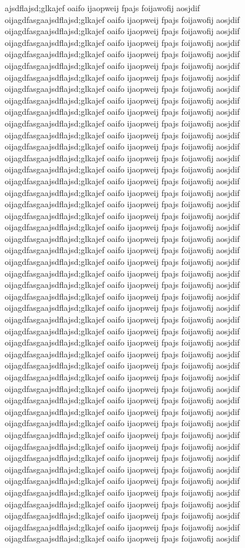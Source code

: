 \documentclass[twoside,a4paper,twocolumn,landscape]{PhanRaw}
\begin{document}
ajsdflajsd;glkajef oaifo ijaopweij fpajs foijawofij aosjdif oijagdfasgaajsdflajsd;glkajef oaifo ijaopweij fpajs foijawofij aosjdif oijagdfasgaajsdflajsd;glkajef oaifo ijaopweij fpajs foijawofij aosjdif oijagdfasgaajsdflajsd;glkajef oaifo ijaopweij fpajs foijawofij aosjdif oijagdfasgaajsdflajsd;glkajef oaifo ijaopweij fpajs foijawofij aosjdif oijagdfasgaajsdflajsd;glkajef oaifo ijaopweij fpajs foijawofij aosjdif oijagdfasgaajsdflajsd;glkajef oaifo ijaopweij fpajs foijawofij aosjdif oijagdfasgaajsdflajsd;glkajef oaifo ijaopweij fpajs foijawofij aosjdif oijagdfasgaajsdflajsd;glkajef oaifo ijaopweij fpajs foijawofij aosjdif oijagdfasgaajsdflajsd;glkajef oaifo ijaopweij fpajs foijawofij aosjdif oijagdfasgaajsdflajsd;glkajef oaifo ijaopweij fpajs foijawofij aosjdif oijagdfasgaajsdflajsd;glkajef oaifo ijaopweij fpajs foijawofij aosjdif oijagdfasgaajsdflajsd;glkajef oaifo ijaopweij fpajs foijawofij aosjdif oijagdfasgaajsdflajsd;glkajef oaifo ijaopweij fpajs foijawofij aosjdif oijagdfasgaajsdflajsd;glkajef oaifo ijaopweij fpajs foijawofij aosjdif oijagdfasgaajsdflajsd;glkajef oaifo ijaopweij fpajs foijawofij aosjdif oijagdfasgaajsdflajsd;glkajef oaifo ijaopweij fpajs foijawofij aosjdif oijagdfasgaajsdflajsd;glkajef oaifo ijaopweij fpajs foijawofij aosjdif oijagdfasgaajsdflajsd;glkajef oaifo ijaopweij fpajs foijawofij aosjdif oijagdfasgaajsdflajsd;glkajef oaifo ijaopweij fpajs foijawofij aosjdif oijagdfasgaajsdflajsd;glkajef oaifo ijaopweij fpajs foijawofij aosjdif oijagdfasgaajsdflajsd;glkajef oaifo ijaopweij fpajs foijawofij aosjdif oijagdfasgaajsdflajsd;glkajef oaifo ijaopweij fpajs foijawofij aosjdif oijagdfasgaajsdflajsd;glkajef oaifo ijaopweij fpajs foijawofij aosjdif oijagdfasgaajsdflajsd;glkajef oaifo ijaopweij fpajs foijawofij aosjdif oijagdfasgaajsdflajsd;glkajef oaifo ijaopweij fpajs foijawofij aosjdif oijagdfasgaajsdflajsd;glkajef oaifo ijaopweij fpajs foijawofij aosjdif oijagdfasgaajsdflajsd;glkajef oaifo ijaopweij fpajs foijawofij aosjdif oijagdfasgaajsdflajsd;glkajef oaifo ijaopweij fpajs foijawofij aosjdif oijagdfasgaajsdflajsd;glkajef oaifo ijaopweij fpajs foijawofij aosjdif oijagdfasgaajsdflajsd;glkajef oaifo ijaopweij fpajs foijawofij aosjdif oijagdfasgaajsdflajsd;glkajef oaifo ijaopweij fpajs foijawofij aosjdif oijagdfasgaajsdflajsd;glkajef oaifo ijaopweij fpajs foijawofij aosjdif oijagdfasgaajsdflajsd;glkajef oaifo ijaopweij fpajs foijawofij aosjdif oijagdfasgaajsdflajsd;glkajef oaifo ijaopweij fpajs foijawofij aosjdif oijagdfasgaajsdflajsd;glkajef oaifo ijaopweij fpajs foijawofij aosjdif oijagdfasgaajsdflajsd;glkajef oaifo ijaopweij fpajs foijawofij aosjdif oijagdfasgaajsdflajsd;glkajef oaifo ijaopweij fpajs foijawofij aosjdif oijagdfasgaajsdflajsd;glkajef oaifo ijaopweij fpajs foijawofij aosjdif oijagdfasgaajsdflajsd;glkajef oaifo ijaopweij fpajs foijawofij aosjdif oijagdfasgaajsdflajsd;glkajef oaifo ijaopweij fpajs foijawofij aosjdif oijagdfasgaajsdflajsd;glkajef oaifo ijaopweij fpajs foijawofij aosjdif oijagdfasgaajsdflajsd;glkajef oaifo ijaopweij fpajs foijawofij aosjdif oijagdfasgaajsdflajsd;glkajef oaifo ijaopweij fpajs foijawofij aosjdif oijagdfasgaajsdflajsd;glkajef oaifo ijaopweij fpajs foijawofij aosjdif oijagdfasgaajsdflajsd;glkajef oaifo ijaopweij fpajs foijawofij aosjdif oijagdfasgaajsdflajsd;glkajef oaifo ijaopweij fpajs foijawofij aosjdif 
\end{document}
